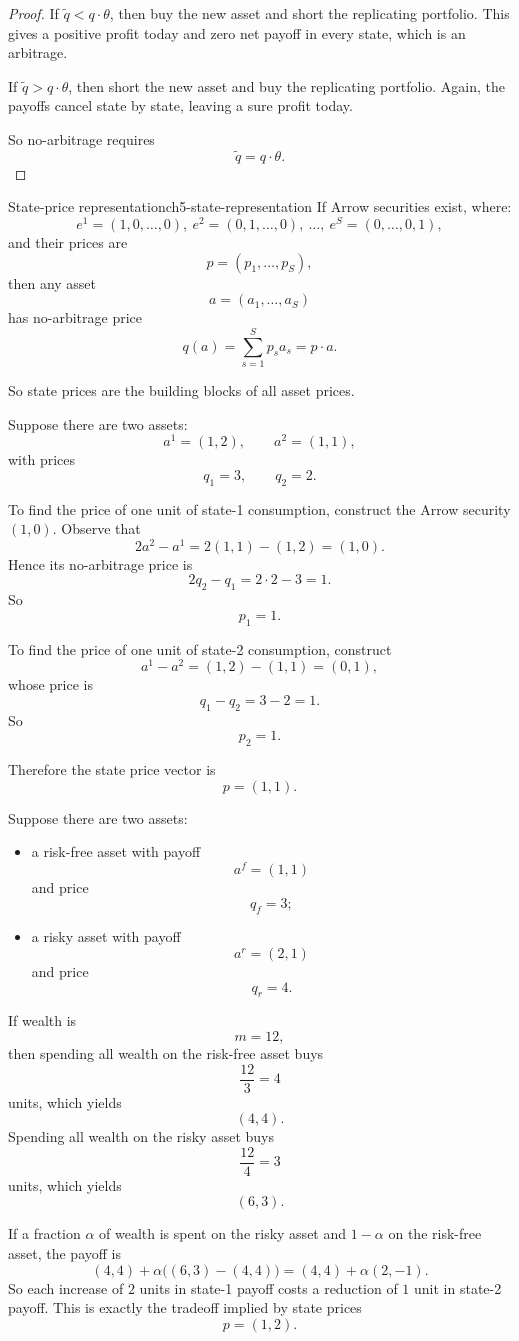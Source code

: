\begin{proof}
If $\tilde q < q\cdot \theta$, then buy the new asset and short the replicating portfolio. This gives a positive profit today and zero net payoff in every state, which is an arbitrage.

If $\tilde q > q\cdot \theta$, then short the new asset and buy the replicating portfolio. Again, the payoffs cancel state by state, leaving a sure profit today.

So no-arbitrage requires
\[
\tilde q = q\cdot \theta.
\]
\end{proof}

\begin{definition}{State-price representation}{ch5-state-representation}
If Arrow securities exist, where:
\[
e^1=(1,0,\dots,0),\ e^2=(0,1,\dots,0),\ \dots,\ e^S=(0,\dots,0,1),
\]
and their prices are
\[
p=(p_1,\dots,p_S),
\]
then any asset
\[
a=(a_1,\dots,a_S)
\]
has no-arbitrage price
\[
q(a)=\sum_{s=1}^S p_s a_s = p\cdot a.
\]
\end{definition}

So state prices are the building blocks of all asset prices.

\begin{examplebox}[title={Worked Example: extracting state prices from asset prices}]
Suppose there are two assets:
\[
a^1=(1,2), \qquad a^2=(1,1),
\]
with prices
\[
q_1=3, \qquad q_2=2.
\]

To find the price of one unit of state-1 consumption, construct the Arrow security $(1,0)$. Observe that
\[
2a^2-a^1 = 2(1,1)-(1,2) = (1,0).
\]
Hence its no-arbitrage price is
\[
2q_2-q_1 = 2\cdot 2 - 3 = 1.
\]
So
\[
p_1=1.
\]

To find the price of one unit of state-2 consumption, construct
\[
a^1-a^2 = (1,2)-(1,1) = (0,1),
\]
whose price is
\[
q_1-q_2 = 3-2 = 1.
\]
So
\[
p_2=1.
\]

Therefore the state price vector is
\[
\boxed{p=(1,1).}
\]
\end{examplebox}

\begin{examplebox}[title={Worked Example: contingent claims from a risky and a risk-free asset}]
Suppose there are two assets:
\begin{itemize}
    \item a risk-free asset with payoff
    \[
    a^f=(1,1)
    \]
    and price
    \[
    q_f=3;
    \]
    \item a risky asset with payoff
    \[
    a^r=(2,1)
    \]
    and price
    \[
    q_r=4.
    \]
\end{itemize}
If wealth is
\[
m=12,
\]
then spending all wealth on the risk-free asset buys
\[
\frac{12}{3}=4
\]
units, which yields
\[
(4,4).
\]
Spending all wealth on the risky asset buys
\[
\frac{12}{4}=3
\]
units, which yields
\[
(6,3).
\]

If a fraction $\alpha$ of wealth is spent on the risky asset and $1-\alpha$ on the risk-free asset, the payoff is
\[
(4,4)+\alpha\bigl((6,3)-(4,4)\bigr)
=
(4,4)+\alpha(2,-1).
\]
So each increase of $2$ units in state-1 payoff costs a reduction of $1$ unit in state-2 payoff. This is exactly the tradeoff implied by state prices
\[
\boxed{p=(1,2).}
\]
\end{examplebox}

